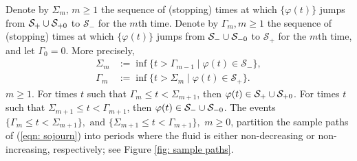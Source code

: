 Denote by \(\Sigma_m,\, m\geq 1\) the sequence of (stopping) times at which \(\{\varphi(t)\}\) jumps from \(\mathcal S_+\cup\mathcal{S}_{+0}\) to \(\mathcal S_- \) for the \(m\)th time. Denote by \(\Gamma_m, m\geq 1\) the sequence of (stopping) times at which \(\{\varphi(t)\}\) jumps from \(\mathcal S_-\cup\mathcal{S}_{-0}\) to \(\mathcal S_+\) for the \(m\)th time, and let \(\Gamma_0 = 0\). More precisely,
\begin{align}
	\Sigma_m &:=\inf\{t > \Gamma_{m-1} \mid \varphi(t)\in\mathcal S_-\}, 
	\\ \Gamma_m &:=\inf\{t > \Sigma_{m} \mid \varphi(t)\in\mathcal S_+\}.
\end{align}
\(m\geq 1\). For times \(t\) such that \(\Gamma_m\leq t<\Sigma_{m+1}\), then \(\varphi(t)\in\mathcal S_+\cup\mathcal{S}_{+0}\). For times \(t\) such that \(\Sigma_{m+1}\leq t< \Gamma_{m+1}\), then \(\varphi(t)\in\mathcal S_-\cup\mathcal{S}_{-0}\). The events \(\{\Gamma_m\leq t< \Sigma_{m+1}\} , \mbox{ and } \{\Sigma_{m+1}\leq t< \Gamma_{m+1}\}, \) \(m\geq 0\), partition the sample paths of (\ref{eqn: sojourn}) into periods where the fluid is either non-decreasing or non-increasing, respectively; see Figure \ref{fig: sample paths}.

